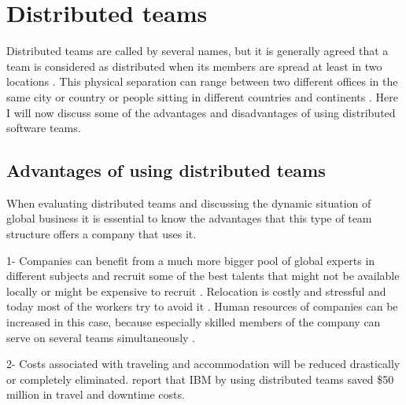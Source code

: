 \chapter{Distributed teams} \label{dt}

Distributed teams are called by several names, but it is generally agreed that a team is considered as distributed when its members are spread at least in two locations \citep{Hinds2005}. This physical separation can range between two different offices in the same city or country or people sitting in different countries and continents \citep{Mortensen2001}. Here I will now discuss some of the advantages and disadvantages of using distributed software teams.

\section{Advantages of using distributed teams}

When evaluating distributed teams and discussing the dynamic situation of global business it is essential to know the advantages that this type of team structure offers a company that uses it. 

1- Companies can benefit from a much more bigger pool of global experts in different subjects and recruit some of the best talents that might not be available locally or might be expensive to recruit \citep{Snyder2003}. Relocation is costly and stressful and today most of the workers try to avoid it \citep{Lipnack1997,Joinson2002}. Human resources of companies can be increased in this case, because especially skilled members of the company can serve on several teams simultaneously \citep{Hertel2004}. 

2- Costs associated with traveling and accommodation will be reduced drastically or completely eliminated. \citet{Baskerville2007} report that IBM by using distributed teams saved \$50 million in travel and downtime costs.

